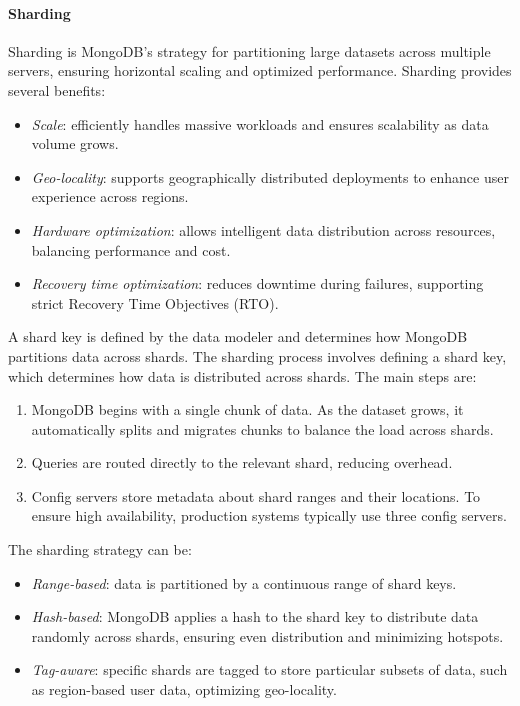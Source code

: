 \paragraph*{Sharding}
Sharding is MongoDB's strategy for partitioning large datasets across multiple servers, ensuring horizontal scaling and optimized performance. 
Sharding provides several benefits:
\begin{itemize} 
    \item \textit{Scale}: efficiently handles massive workloads and ensures scalability as data volume grows. 
    \item \textit{Geo-locality}: supports geographically distributed deployments to enhance user experience across regions. 
    \item \textit{Hardware optimization}: allows intelligent data distribution across resources, balancing performance and cost. 
    \item \textit{Recovery time optimization}: reduces downtime during failures, supporting strict Recovery Time Objectives (RTO).
\end{itemize}
A shard key is defined by the data modeler and determines how MongoDB partitions data across shards. 
The sharding process involves defining a shard key, which determines how data is distributed across shards. 
The main steps are:
\begin{enumerate} 
    \item MongoDB begins with a single chunk of data. 
        As the dataset grows, it automatically splits and migrates chunks to balance the load across shards.
    \item Queries are routed directly to the relevant shard, reducing overhead. 
    \item Config servers store metadata about shard ranges and their locations. 
        To ensure high availability, production systems typically use three config servers. 
\end{enumerate}
The sharding strategy can be: 
\begin{itemize} 
    \item \textit{Range-based}: data is partitioned by a continuous range of shard keys. 
    \item \textit{Hash-based}: MongoDB applies a hash to the shard key to distribute data randomly across shards, ensuring even distribution and minimizing hotspots. 
    \item \textit{Tag-aware}: specific shards are tagged to store particular subsets of data, such as region-based user data, optimizing geo-locality. 
\end{itemize}
